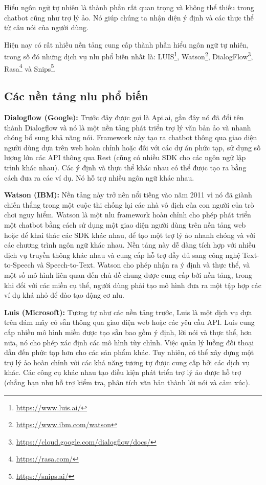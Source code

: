 Hiểu ngôn ngữ tự nhiên là thành phần rất quan trọng và không thể thiếu trong chatbot cũng như trợ lý ảo. Nó giúp chúng ta nhận diện ý định và các thực thể từ câu nói của người dùng.

Hiện nay có rất nhiều nền tảng cung cấp thành phần hiểu ngôn ngữ tự nhiên, trong số đó những dịch vụ \ac{nlu} phổ biến nhất là: LUIS\footnote{\url{https://www.luis.ai/}}, Watson\footnote{\url{https://www.ibm.com/watson}}, DialogFlow\footnote{\url{https://cloud.google.com/dialogflow/docs/}}, Rasa\footnote{\url{https://rasa.com/}} và Snips\footnote{\url{https://snips.ai/}}.

\subsection{Các nền tảng \ac{nlu} phổ biến}

\textbf{Dialogflow (Google):} Trước đây được gọi là Api.ai, gần đây nó đã đổi tên thành Dialogflow và nó là một nền tảng phát triển trợ lý văn bản ảo và nhanh chóng bổ sung khả năng nói. Framework này tạo ra chatbot thông qua giao diện người dùng dựa trên web hoàn chỉnh hoặc đối với các dự án phức tạp, sử dụng số lượng lớn các API thông qua Rest (cũng có nhiều SDK cho các ngôn ngữ lập trình khác nhau). Các ý định và thực thể khác nhau có thể được tạo ra bằng cách đưa ra các ví dụ. Nó hỗ trợ nhiều ngôn ngữ khác nhau.

\textbf{Watson (IBM):} Nền tảng này trở nên nổi tiếng vào năm 2011 vì nó đã giành chiến thắng trong một cuộc thi chống lại các nhà vô địch của con người của trò chơi nguy hiểm. Watson là một \ac{nlu} framework hoàn chỉnh cho phép phát triển một chatbot bằng cách sử dụng một giao diện người dùng trên nền tảng web hoặc để khai thác các SDK khác nhau, để tạo một trợ lý ảo nhanh chóng và với các chương trình ngôn ngữ khác nhau. Nền tảng này dễ dàng tích hợp với nhiều dịch vụ truyền thông khác nhau và cung cấp hỗ trợ đầy đủ sang công nghệ Text-to-Speech và Speech-to-Text. Watson cho phép nhận ra ý định và thực thể, và một số mô hình liên quan đến chủ đề chung được cung cấp bởi nền tảng, trong khi đối với các miền cụ thể, người dùng phải tạo mô hình đưa ra một tập hợp các ví dụ khá nhỏ để đào tạo động cơ \ac{nlu}.

\textbf{Luis (Microsoft):} Tương tự như các nền tảng trước, Luis là một dịch vụ dựa trên đám mây có sẵn thông qua giao diện web hoặc các yêu cầu API. Luis cung cấp nhiều mô hình miền được tạo sẵn bao gồm ý định, lời nói và thực thể, hơn nữa, nó cho phép xác định các mô hình tùy chỉnh. Việc quản lý luồng đối thoại dẫn đến phức tạp hơn cho các sản phẩm khác. Tuy nhiên, có thể xây dựng một trợ lý ảo hoàn chỉnh với các khả năng tương tự được cung cấp bởi các dịch vụ khác. Các công cụ khác nhau tạo điều kiện phát triển trợ lý ảo được hỗ trợ (chẳng hạn như hỗ trợ kiểm tra, phân tích văn bản thành lời nói và cảm xúc).

